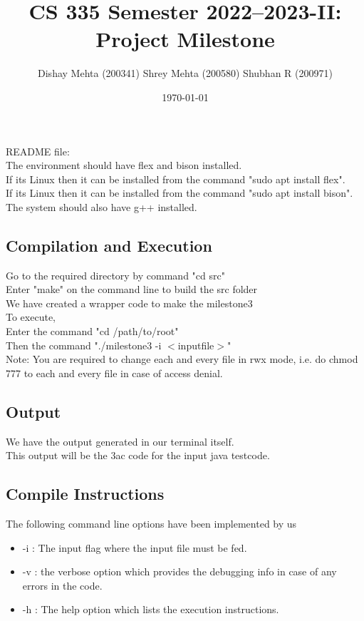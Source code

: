 \documentclass[12pt]{article}
\begin{document}
\title{\vspace{-3cm}CS 335 Semester 2022--2023-II: Project Milestone }
\author{Dishay Mehta (200341) Shrey Mehta (200580) Shubhan R (200971)}
\date{\today}
\maketitle

\section*{}
README file:\\
The environment should have flex and bison installed.\\
If its Linux then it can be installed from the command "sudo apt install flex".\\
If its Linux then it can be installed from the command "sudo apt install bison".\\
The system should also have g++ installed.\\

\subsection*{Compilation and Execution}
Go to the required directory by command "cd src" \\
Enter "make" on the command line to build the src folder\\
We have created a wrapper code to make the milestone3\\
To execute,\\
Enter the command "cd /path/to/root"\\
Then the command "./milestone3 -i $<$inputfile$>$"\\
Note: You are required to change each and every file in rwx mode, i.e. do chmod 777 to each and every file in case of access denial.

\subsection*{Output}
We have the output generated in our terminal itself.\\
This output will be the 3ac code for the input java testcode.

\subsection*{Compile Instructions}
The following command line options have been implemented by us
\begin{itemize}
    \item -i : The input flag where the input file must be fed.
    \item -v : the verbose option which provides the debugging info in case of any errors in the code.
    \item -h : The help option which lists the execution instructions. 
\end{itemize}
\end{document}
